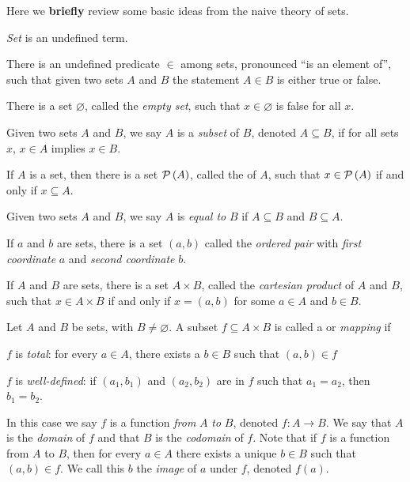 Here we \textbf{briefly} review some basic ideas from the naive theory of sets.

\begin{proplist}
\item \emph{Set} is an undefined term.

\item There is an undefined predicate \(\in\) among sets, pronounced ``is an element of'', such that given two sets \(A\) and \(B\) the statement \(A \in B\) is either true or false.

\item There is a set \(\varnothing\), called the \emph{empty set}, such that \(x \in \varnothing\) is false for all \(x\).

\item Given two sets \(A\) and \(B\), we say \(A\) is a \emph{subset} of \(B\), denoted \(A \subseteq B\), if for all sets \(x\), \(x \in A\) implies \(x \in B\).

\item If \(A\) is a set, then there is a set \(\mathcal{P}\left(A\right)\), called the  of \(A\), such that \(x \in \mathcal{P}\left(A\right)\) if and only if \(x \subseteq A\).

\item Given two sets \(A\) and \(B\), we say \(A\) is \emph{equal to} \(B\) if \(A \subseteq B\) and \(B \subseteq A\).

\item If \(a\) and \(b\) are sets, there is a set \((a,b)\) called the \emph{ordered pair} with \emph{first coordinate} \(a\) and \emph{second coordinate} \(b\).

\item If \(A\) and \(B\) are sets, there is a set \(A \times B\), called the \emph{cartesian product} of \(A\) and \(B\), such that \(x \in A \times B\) if and only if \(x = (a,b)\) for some \(a \in A\) and \(b \in B\).

\item Let \(A\) and \(B\) be sets, with \(B \neq \varnothing\). A subset \(f \subseteq A \times B\) is called a  or \emph{mapping} if
\begin{proplist}
\item \(f\) is \emph{total}: for every \(a \in A\), there exists a \(b \in B\) such that \((a,b) \in f\)
\item \(f\) is \emph{well-defined}: if \((a_1,b_1)\) and \((a_2,b_2)\) are in \(f\) such that \(a_1 = a_2\), then \(b_1 = b_2\).
\end{proplist}
In this case we say \(f\) is a function \emph{from} \(A\) \emph{to} \(B\), denoted \(f : A \rightarrow B\). We say that \(A\) is the \emph{domain} of \(f\) and that \(B\) is the \emph{codomain} of \(f\). Note that if \(f\) is a function from \(A\) to \(B\), then for every \(a \in A\) there exists a unique \(b \in B\) such that \((a,b) \in f\). We call this \(b\) the \emph{image} of \(a\) under \(f\), denoted \(f(a)\).


\end{proplist}
